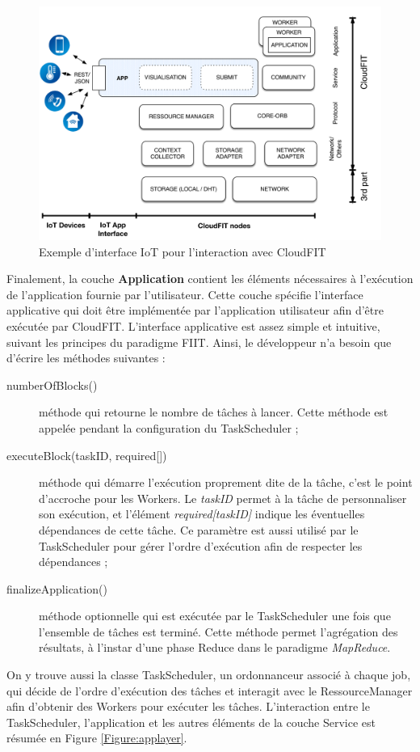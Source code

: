 \begin{figure}
	\begin{center}
		\includegraphics[width=0.65\linewidth]{img/CloudFITstack-IoT}
		\caption{Exemple d'interface IoT pour l'interaction avec CloudFIT}\label{fig:cloudFitStackIoT}
	\end{center}
\end{figure}


Finalement, la couche \textbf{Application} contient les éléments nécessaires à l'exécution de l'application fournie par l'utilisateur. Cette couche spécifie l'interface applicative qui doit être implémentée par l'application utilisateur afin d'être exécutée par CloudFIT. L'interface applicative est assez simple et intuitive, suivant les principes du paradigme FIIT. Ainsi, le développeur n'a besoin que d'écrire les méthodes suivantes :
\begin{description}
	\item [numberOfBlocks()] méthode qui retourne le nombre de tâches à lancer. Cette méthode est appelée pendant la configuration du TaskScheduler ;
	\item [executeBlock(taskID, required{[]}) ] méthode qui démarre l'exécution proprement dite de la tâche, c'est le point d'accroche pour les Workers. Le \textit{taskID} permet à la tâche de personnaliser son exécution, et l'élément \textit{required[taskID]} indique les éventuelles dépendances de cette tâche. Ce paramètre est aussi utilisé par le TaskScheduler pour gérer l'ordre d'exécution afin de respecter les dépendances ;
	\item [finalizeApplication()] méthode optionnelle qui est exécutée par le TaskScheduler une fois que l'ensemble de tâches est terminé. Cette méthode permet l'agrégation des résultats, à l'instar d'une phase Reduce dans le paradigme \textit{MapReduce}.
\end{description}

On y trouve aussi la classe TaskScheduler, un ordonnanceur associé à chaque job, qui décide de l'ordre d'exécution des tâches et interagit avec le RessourceManager afin d'obtenir des Workers pour exécuter les tâches. L'interaction entre le TaskScheduler, l'application et les autres éléments de la couche Service est résumée en Figure \ref{Figure:applayer}. 


